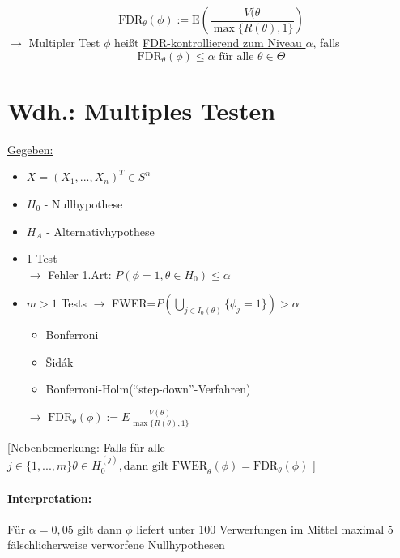 \documentclass[10pt]{report}
\theoremstyle{definition}
\begin{document}
\[ \text{FDR}_{\theta}(\phi) := \text{E} \left( \frac{V(\theta}{\max\{R(\theta),1\}}\right) \]
$\rightarrow$ Multipler Test $\phi$ heißt \underline{FDR-kontrollierend zum Niveau $\alpha$}, falls
\[ \text{FDR}_{\theta}(\phi) \leq \alpha \text{ für alle } \theta \in \Theta \]


\section{Wdh.: Multiples Testen}
\underline{Gegeben:} 
\begin{itemize}
 \item $X=(X_1,...,X_n)^T \in S^n$
 \item $H_0$ - Nullhypothese
 \item $H_A$ - Alternativhypothese
 \item 1 Test \\ $\rightarrow$ Fehler 1.Art: $P(\phi=1,\theta \in H_0) \leq \alpha$
 \item $m > 1$ Tests $\rightarrow$ FWER=$P \left(\bigcup_{j \in I_0(\theta)} \{ \phi_j = 1 \} \right) > \alpha$
 \begin{itemize}
  \item Bonferroni
  \item \v Sid\'ak
  \item Bonferroni-Holm(``step-down''-Verfahren)
 \end{itemize}
 $\rightarrow \text{ FDR}_{\theta}(\phi) := E \frac{V(\theta)}{\max\{R(\theta),1\}}$
\end{itemize}
[Nebenbemerkung: Falls für alle $j \in  \{1,...,m\} \theta \in H_0^{(j)}, \text{dann gilt FWER}_{\theta}(\phi)=\text{FDR}_{\theta}(\phi)$ ]
\paragraph{Interpretation:}
Für $\alpha=0,05$ gilt dann $\phi$ liefert unter 100 Verwerfungen im Mittel maximal 5 fälschlicherweise verworfene Nullhypothesen
\end{document}
